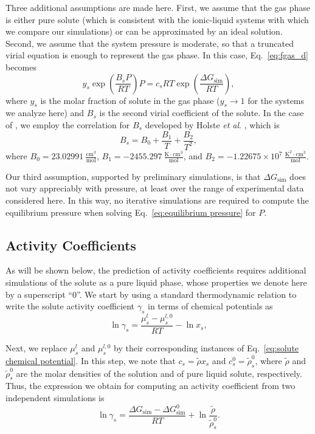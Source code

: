 \documentclass[3p,twocolumn]{elsarticle}
\begin{document}
Three additional assumptions are made here. First, we assume that the gas phase is either pure solute (which is consistent with the ionic-liquid systems with which we compare our simulations) or can be approximated by an ideal solution. Second, we assume that the system pressure is moderate, so that a truncated virial equation is enough to represent the gas phase. In this case, Eq.~\eqref{eq:fgas_d} becomes
\begin{equation}
\label{eq:equilibrium pressure}
y_s \exp\left( \frac{B_s P}{R T} \right) P = c_s R T \exp \left( \frac{\Delta G_\text{sim}}{R T} \right),
\end{equation}
where $y_s$ is the molar fraction of solute in the gas phase ($y_s \rightarrow 1$ for the systems we analyze here) and $B_s$ is the second virial coefficient of the solute.
In the case of , we employ the correlation for $B_s$ developed by Holste \textit{et al}. \cite{Holste_1987}, which is
\begin{equation}
B_s = B_0 + \frac{B_1}{T} + \frac{B_2}{T^2},
\end{equation}
where $B_0 = 23.02991~\mathrm{\frac{cm^3}{mol}}$, $B_1 = -2455.297~\mathrm{\frac{K \cdot cm^3}{mol}}$, and $B_2 = -1.22675 \times 10^7~\mathrm{\frac{K^2 \cdot cm^3}{mol}}$.

Our third assumption, supported by preliminary simulations, is that $\Delta G_\text{sim}$ does not vary appreciably with pressure, at least over the range of experimental data considered here.
In this way, no iterative simulations are required to compute the equilibrium pressure when solving Eq.~\eqref{eq:equilibrium pressure} for $P$.

\subsection*{Activity Coefficients}

As will be shown below, the prediction of activity coefficients requires additional simulations of the solute as a pure liquid phase, whose properties we denote here by a superscript ``$0$''.
We start by using a standard thermodynamic relation \cite{Tester} to write the solute activity coefficient $\gamma_s$ in terms of chemical potentials as
\begin{equation}
\ln \gamma_s = \frac{\mu_s^l - \mu_s^{l,0}}{R T} - \ln x_s,
\end{equation}

Next, we replace $\mu_s^l$ and $\mu_s^{l,0}$ by their corresponding instances of Eq.~\eqref{eq:solute chemical potential}. In this step, we note that $c_s = \tilde{\rho} x_s$ and $c_s^0 = \tilde{\rho}_s^0$, where $\tilde{\rho}$ and $\tilde{\rho}_s^0$ are the molar densities of the solution and of pure liquid solute, respectively. Thus, the expression we obtain for computing an activity coefficient from two independent simulations is
\begin{equation}
\label{eq:gamma}
\ln \gamma_s = \frac{\Delta G_\text{sim} - \Delta G_\text{sim}^{0}}{R T} + \ln \frac{\tilde{\rho}}{\tilde{\rho}_s^0}.
\end{equation}
\end{document}
